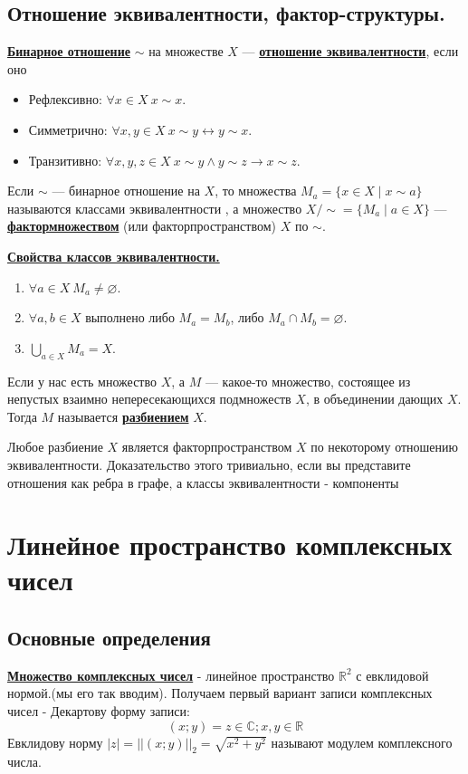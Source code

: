 \documentclass[twoside]{book}
\newcommand{\deff}[1]{\underline{\textbf{#1}}}
\newcommand{\thmm}[1]{\underline{\textbf{#1}}}
\begin{document}
\subsection{Отношение эквивалентности, фактор-структуры.}



\deff{Бинарное отношение} $\sim$ на множестве $X$ --- \deff{отношение эквивалентности}, если оно
\begin{itemize}
    \item Рефлексивно: $\forall x\in X~x\sim x$.
    \item Симметрично: $\forall x,y\in X~x\sim y\leftrightarrow y\sim x$.
    \item Транзитивно: $\forall x,y,z\in X~x\sim y\land y\sim z\rightarrow x\sim z$.
\end{itemize}
Если $\sim$ --- бинарное отношение на $X$, то множества $M_a=\{x\in X\mid x\sim a\}$ называются классами эквивалентности , а множество $X/\sim=\{M_a\mid a\in X\}$ --- \deff{фактормножеством} (или {факторпространством}) $X$ по $\sim$.

\thmm{Свойства классов эквивалентности.}
\begin{enumerate}
    \item $\forall a\in X~M_a\neq\varnothing$.
    \item $\forall a,b\in X$ выполнено либо $M_a=M_b$, либо $M_a\cap M_b=\varnothing$.
    \item $\bigcup\limits_{a\in X}M_a=X$.
\end{enumerate}

Если у нас есть множество $X$, а $M$ --- какое-то множество, состоящее из непустых взаимно непересекающихся подмножеств $X$, в объединении дающих $X$. Тогда $M$ называется \deff{разбиением} $X$.


Любое разбиение $X$ является факторпространством $X$ по некоторому отношению эквивалентности. Доказательство этого тривиально, если вы представите отношения как ребра в графе, а классы эквивалентности - компоненты


\section{Линейное пространство комплексных чисел}
\subsection{Основные определения}
\deff{Множество комплексных чисел} - линейное пространство \(\mathbb{R}^2\) с евклидовой нормой.(мы его так вводим).
Получаем первый вариант записи комплексных чисел - Декартову форму записи: $$(x; y)=z\in\mathbb{C}; x, y\in\mathbb{R}$$
Евклидову норму \(|z|=||(x;y)||_2=\sqrt{x^2 + y^2}\) называют модулем комплексного числа.
\end{document}
